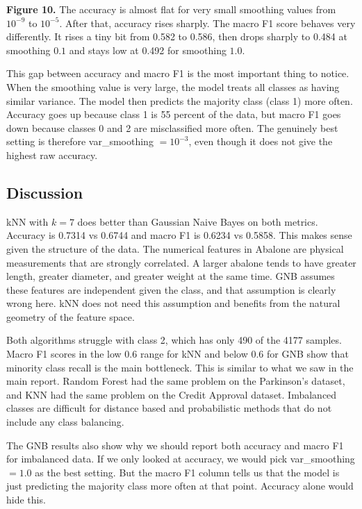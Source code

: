 \documentclass[11pt,letterpaper]{article}
\begin{document}
\textbf{Figure 10.} The accuracy is almost flat for very
small smoothing values from $10^{-9}$ to $10^{-5}$. After that, accuracy rises
sharply. The macro F1 score behaves very differently. It rises a tiny bit
from 0.582 to 0.586, then drops sharply to 0.484 at smoothing $0.1$ and stays
low at 0.492 for smoothing $1.0$.

This gap between accuracy and macro F1 is the most important thing to notice.
When the smoothing value is very large, the model treats all classes as having
similar variance. The model then predicts the majority class (class 1) more
often. Accuracy goes up because class 1 is 55 percent of the data, but macro
F1 goes down because classes 0 and 2 are misclassified more often. The
genuinely best setting is therefore var\_smoothing $= 10^{-3}$, even though it
does not give the highest raw accuracy.

\subsection{Discussion}

kNN with $k=7$ does better than Gaussian Naive Bayes on both metrics. Accuracy
is 0.7314 vs 0.6744 and macro F1 is 0.6234 vs 0.5858. This makes sense given
the structure of the data. The numerical features in Abalone are physical
measurements that are strongly correlated. A larger abalone tends to have
greater length, greater diameter, and greater weight at the same time. GNB
assumes these features are independent given the class, and that assumption
is clearly wrong here. kNN does not need this assumption and benefits from
the natural geometry of the feature space.

Both algorithms struggle with class 2, which has only 490 of the 4177 samples.
Macro F1 scores in the low 0.6 range for kNN and below 0.6 for GNB show that
minority class recall is the main bottleneck. This is similar to what we saw
in the main report. Random Forest had the same problem on the Parkinson's
dataset, and KNN had the same problem on the Credit Approval dataset.
Imbalanced classes are difficult for distance based and probabilistic methods
that do not include any class balancing.

The GNB results also show why we should report both accuracy and macro F1 for
imbalanced data. If we only looked at accuracy, we would pick var\_smoothing
$= 1.0$ as the best setting. But the macro F1 column tells us that the model
is just predicting the majority class more often at that point. Accuracy
alone would hide this.
\end{document}
